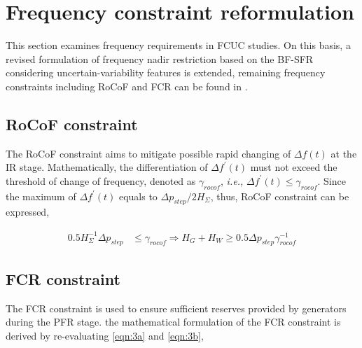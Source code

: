 \documentclass[lettersize,journal]{IEEEtran}
\begin{document}
\section{Frequency constraint reformulation} \vspace{-0.0050in}

This section examines frequency requirements in FCUC studies. On this basis, a revised formulation of frequency nadir restriction based on the BF-SFR considering uncertain-variability features is extended, remaining frequency constraints including RoCoF and FCR can be found in \cite{9765359}.

\vspace{-0.125in}

\subsection{RoCoF constraint}


The RoCoF constraint aims to mitigate possible rapid changing of \(\varDelta f(t)\) at the IR stage. Mathematically, the differentiation of $\varDelta f^{\prime}(t)$ must not exceed the threshold of change of frequency, denoted as $\gamma_{rocof}$, \textit{i.e.,} $\varDelta f^{\prime}(t)\!\leq \! \gamma_{rocof}$. Since the maximum of $\varDelta f^{\prime}(t)$ equals to ${\varDelta p_{{step} }}/{2 H_{\varSigma}}$, thus, RoCoF constraint can be expressed,

\vspace{-0.125in}

\begin{small}
	\begin{align}\label{eqn:10}
		0.5{H_{\varSigma}^{-1}}{\varDelta p_{{step}}} & \!\leq\! \gamma_{rocof}\Rightarrow H_{G} \!\!+\!\! H_{W}\!\geq\! 0.5 {\varDelta p_{{step} }} \gamma_{rocof}^{-1}
	\end{align}
\end{small}

\vspace{-0.125in}

\subsection{FCR constraint}

The FCR constraint is used to ensure sufficient reserves provided by generators during the PFR stage. the mathematical formulation of the FCR constraint is derived by re-evaluating \eqref{eqn:3a} and \eqref{eqn:3b},
\end{document}
